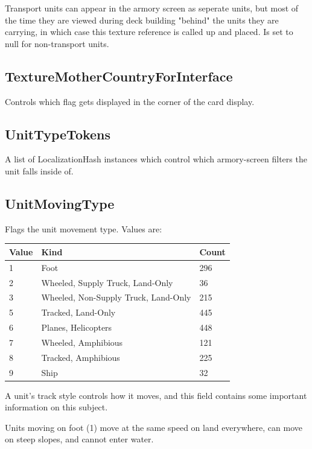 \documentclass{article}
\begin{document}
Transport units can appear in the armory screen as seperate units, but most of the time they are viewed during deck building "behind" the units they are carrying, in which case this texture reference is called up and placed. Is set to null for non-transport units.

\subsection{TextureMotherCountryForInterface}

Controls which flag gets displayed in the corner of the card display.

\subsection{UnitTypeTokens}

A list of LocalizationHash instances which control which armory-screen filters the unit falls inside of.

\subsection{UnitMovingType}

Flags the unit movement type. Values are:

\begin{center}
    \begin{tabular}{ | l | l | l |}
    \hline
	Value & Kind & Count\\ \hline
	1 & Foot & 296\\
	2 & Wheeled, Supply Truck, Land-Only & 36\\
	3 & Wheeled, Non-Supply Truck, Land-Only & 215\\
	5 & Tracked, Land-Only & 445\\
	6 & Planes, Helicopters & 448\\
	7 & Wheeled, Amphibious & 121\\
	8 & Tracked, Amphibious & 225\\
	9 & Ship & 32\\
    \hline
    \end{tabular}
\end{center}

A unit's track style controls how it moves, and this field contains some important information on this subject.

Units moving on foot (1) move at the same speed on land everywhere, can move on steep slopes, and cannot enter water. 
\end{document}
